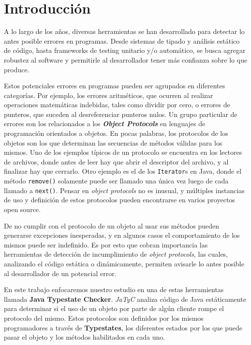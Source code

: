 \chapter{Introducción}

A lo largo de los años, diversas herramientas se han desarrollado para detectar lo antes posible errores en programas. Desde sistemas de tipado y análisis estático de código, hasta frameworks de testing unitario y/o automático, se busca agregar robustez al software y permitirle al desarrollador tener más confianza sobre lo que produce.

Estos potenciales errores en programas pueden ser agrupados en diferentes categorías. Por ejemplo, los errores aritméticos, que ocurren al realizar operaciones matemáticas indebidas, tales como dividir por cero, o errores de punteros, que suceden al desreferenciar punteros nulos. Un grupo particular de errores son los relacionados a los \textbf{\textit{Object Protocols}} en lenguajes de programación orientados a objetos. En pocas palabras, los protocolos de los objetos son los que determinan las secuencias de métodos válidas para los mismos. Uno de los ejemplos típicos de un protocolo se encuentra en los lectores de archivos, donde antes de leer hay que abrir el descriptor del archivo, y al finalizar hay que cerrarlo. Otro ejemplo es el de los \texttt{Iterator}s en Java\cite{java-docs:iterator}, donde el método \texttt{remove()} solamente puede ser llamado una única vez luego de cada llamado a \texttt{next()}. Pensar en \textit{object protocols} no es inusual, y múltiples instancias de uso y definición de estos protocolos pueden encontrarse en varios proyectos open source\cite{papers:protocols-in-the-wild}.

De no cumplir con el protocolo de un objeto al usar sus métodos pueden generarse excepciones inesperadas, y en algunos casos el comportamiento de los mismos puede ser indefinido. Es por esto que cobran importancia las herramientas de detección de incumplimiento de \textit{object protocols}, las cuales, analizando el código estática o dinámicamente, permiten avisarle lo antes posible al desarrollador de un potencial error.

En este trabajo enfocaremos nuestro estudio en una de estas herramientas llamada \textbf{Java Typestate Checker}\cite{jatyc:github}. \textit{JaTyC} analiza código de Java estáticamente para determinar si el uso de un objeto por parte de algún cliente rompe el protocolo del mismo. Estos protocolos son definidos por los mismos programadores a través de \textbf{Typestates}, los diferentes estados por los que puede pasar el objeto y los métodos habilitados en cada uno.

